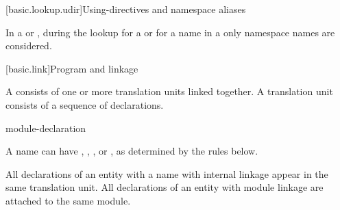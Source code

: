 [basic.lookup.udir]{Using-directives and namespace aliases}

\pnum
{}%
%
In a  or ,
during the lookup for a  or for a name in a
only namespace names are considered.%
%

[basic.link]{Program and linkage}%

\pnum
{}%
%
A  consists of one or more translation units
linked together. A translation unit consists
of a sequence of declarations.

\begin{bnf}
\br
    \br
     module-declaration  
\end{bnf}

\pnum
{}%
A name can have
,
,
, or
,
as determined by the rules below.
\begin{note}
All declarations of an entity with a name with internal linkage
appear in the same translation unit.
All declarations of an entity with module linkage
are attached to the same module.
\end{note}

